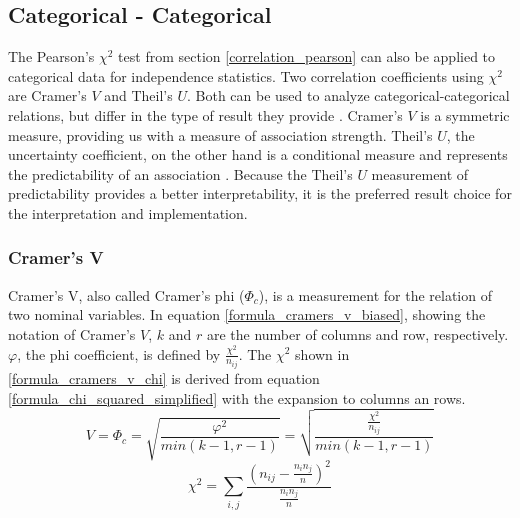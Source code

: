 \documentclass[a4paper,headsepline,footsepline,fontsize=11pt,BCOR=12mm,DIV=12]{report}
\begin{document}
\subsection{Categorical - Categorical}
The Pearson's $\chi^2$ test from section \ref{correlation_pearson} can also be applied to categorical data for independence statistics. Two correlation coefficients using $\chi^2$ are Cramer’s $V$ and Theil’s $U$. Both can be used to analyze categorical-categorical relations, but differ in the type of result they provide \cite{OutsideTwoStandardDeviations2018}. Cramer’s $V$ is a symmetric measure, providing us with a measure of association strength. Theil’s $U$, the uncertainty coefficient, on the other hand is a conditional measure and represents the predictability of an association \cite{Akoglu2018,StackExchange2020}. Because the Theil’s $U$ measurement of predictability provides a better interpretability, it is the preferred  result choice for the interpretation and implementation. 

\subsubsection{Cramer’s V}

Cramer’s V, also called Cramer's phi ($\Phi_c$), is a measurement for the relation of two nominal variables. In equation \ref{formula_cramers_v_biased}, showing the notation of Cramer’s $V$, $k$ and $r$ are the number of columns and row, respectively. $\varphi$, the phi coefficient, is defined by $\frac{{\chi^2}}{n_{ij}}$. The $\chi^2$ shown in \ref{formula_cramers_v_chi} is derived from equation \ref{formula_chi_squared_simplified} with the expansion to columns an rows. \cite{Sheskin1997,Bergsma2013}
\smallskip
\begin{equation}
\label{formula_cramers_v_biased}
	V = \Phi_c =  \sqrt{\frac{{\varphi^2}}{min(k-1,r-1)}} = \sqrt{\frac{\frac{{\chi^2}}{n_{ij}}}{min(k-1,r-1)}}
\end{equation}
\begin{equation}
\label{formula_cramers_v_chi}
	\chi^2 =  \sum_{i,j}{\frac{(n_{ij}-\frac{n_i n_j}{n})^2}{\frac{n_i n_j}{n}}}
\end{equation}

\smallskip
\end{document}

